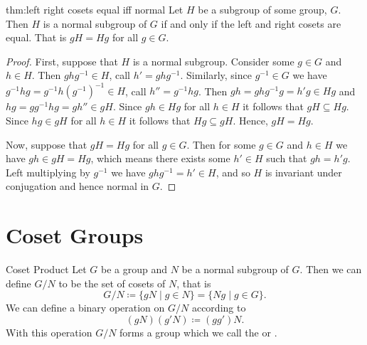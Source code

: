 \begin{thm}{}{thm:left right cosets equal iff normal}
    Let \(H\) be a subgroup of some group, \(G\).
    Then \(H\) is a normal subgroup of \(G\) if and only if the left and right cosets are equal.
    That is \(gH = Hg\) for all \(g \in G\).
    
    \begin{proof}
        First, suppose that \(H\) is a normal subgroup.
        Consider some \(g \in G\) and \(h \in H\).
        Then \(ghg^{-1} \in H\), call \(h' = ghg^{-1}\).
        Similarly, since \(g^{-1} \in G\) we have \(g^{-1}hg = g^{-1}h(g^{-1})^{-1} \in H\), call \(h'' = g^{-1}hg\).
        Then \(gh = ghg^{-1}g = h'g \in Hg\) and \(hg = gg^{-1}hg = gh'' \in gH\).
        Since \(gh \in Hg\) for all \(h \in H\) it follows that \(gH \subseteq Hg\).
        Since \(hg \in gH\) for all \(h \in H\) it follows that \(Hg \subseteq gH\).
        Hence, \(gH = Hg\).
        
        Now, suppose that \(gH = Hg\) for all \(g \in G\).
        Then for some \(g \in G\) and \(h \in H\) we have \(gh \in gH = Hg\), which means there exists some \(h' \in H\) such that \(gh = h'g\).
        Left multiplying by \(g^{-1}\) we have \(ghg^{-1} = h' \in H\), and so \(H\) is invariant under conjugation and hence normal in \(G\).
    \end{proof}
\end{thm}

\section{Coset Groups}
\begin{dfn}{Coset Product}{}
    Let \(G\) be a group and \(N\) be a normal subgroup of \(G\).
    Then we can define \(G/N\) to be the set of cosets of \(N\), that is
    \begin{equation}
        G/N \coloneqq \{gN \mid g \in N\} = \{Ng \mid g \in G\}.
    \end{equation}
    We can define a binary operation on \(G/N\) according to
    \begin{equation}
        (gN)(g'N) \coloneqq (gg')N.
    \end{equation}
    With this operation \(G/N\) forms a group which we call the  or .
\end{dfn}

